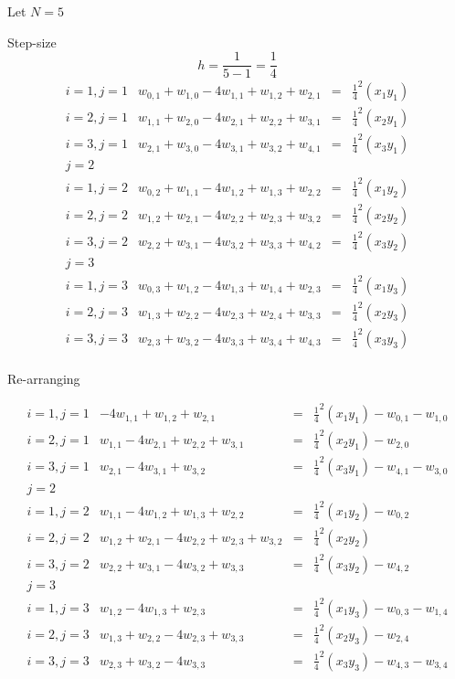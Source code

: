 Let $N=5$

Step-size
\[h=\frac{1}{5-1}=\frac{1}{4}\]
\[\begin{array}{l|rcl}
i=1,j=1&w_{0,1}+w_{1,0}-4w_{1,1}+w_{1,2}+w_{2,1}&=&\frac{1}{4}^2(x_1y_1)\\
i=2,j=1&w_{1,1}+w_{2,0}-4w_{2,1}+w_{2,2}+w_{3,1}&=&\frac{1}{4}^2(x_2y_1)\\
i=3,j=1&w_{2,1}+w_{3,0}-4w_{3,1}+w_{3,2}+w_{4,1}&=&\frac{1}{4}^2(x_3y_1)\\
j=2\\
i=1,j=2&w_{0,2}+w_{1,1}-4w_{1,2}+w_{1,3}+w_{2,2}&=&\frac{1}{4}^2(x_1y_2)\\
i=2,j=2&w_{1,2}+w_{2,1}-4w_{2,2}+w_{2,3}+w_{3,2}&=&\frac{1}{4}^2(x_2y_2)\\
i=3,j=2&w_{2,2}+w_{3,1}-4w_{3,2}+w_{3,3}+w_{4,2}&=&\frac{1}{4}^2(x_3y_2)\\
j=3\\
i=1,j=3&w_{0,3}+w_{1,2}-4w_{1,3}+w_{1,4}+w_{2,3}&=&\frac{1}{4}^2(x_1y_3)\\
i=2,j=3&w_{1,3}+w_{2,2}-4w_{2,3}+w_{2,4}+w_{3,3}&=&\frac{1}{4}^2(x_2y_3)\\
i=3,j=3&w_{2,3}+w_{3,2}-4w_{3,3}+w_{3,4}+w_{4,3}&=&\frac{1}{4}^2(x_3y_3)\\
\end{array}
\]	

Re-arranging

\[\begin{array}{l|rcl}
i=1,j=1&-4w_{1,1}+w_{1,2}+w_{2,1}&=&\frac{1}{4}^2(x_1y_1)-w_{0,1}-w_{1,0}\\
i=2,j=1&w_{1,1}-4w_{2,1}+w_{2,2}+w_{3,1}&=&\frac{1}{4}^2(x_2y_1)-w_{2,0}\\
i=3,j=1&w_{2,1}-4w_{3,1}+w_{3,2}&=&\frac{1}{4}^2(x_3y_1)-w_{4,1}-w_{3,0}\\
j=2\\
i=1,j=2&w_{1,1}-4w_{1,2}+w_{1,3}+w_{2,2}&=&\frac{1}{4}^2(x_1y_2)-w_{0,2}\\
i=2,j=2&w_{1,2}+w_{2,1}-4w_{2,2}+w_{2,3}+w_{3,2}&=&\frac{1}{4}^2(x_2y_2)\\
i=3,j=2&w_{2,2}+w_{3,1}-4w_{3,2}+w_{3,3}&=&\frac{1}{4}^2(x_3y_2)-w_{4,2}\\
j=3\\
i=1,j=3&w_{1,2}-4w_{1,3}+w_{2,3}&=&\frac{1}{4}^2(x_1y_3)-w_{0,3}-w_{1,4}\\
i=2,j=3&w_{1,3}+w_{2,2}-4w_{2,3}+w_{3,3}&=&\frac{1}{4}^2(x_2y_3)-w_{2,4}\\
i=3,j=3&w_{2,3}+w_{3,2}-4w_{3,3}&=&\frac{1}{4}^2(x_3y_3)-w_{4,3}-w_{3,4}\\
\end{array}
\]	

